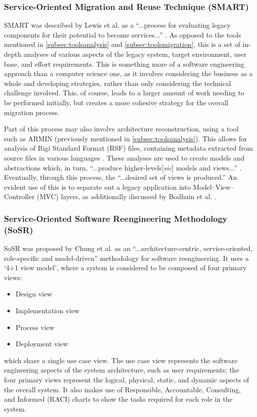 \documentclass[12pt,journal,compsoc]{IEEEtran}
\begin{document}
\subsubsection{Service-Oriented Migration and Reuse Technique (SMART)}
\label{subsubsec:smart}
SMART was described by Lewis et al. as a ``...process for evaluating legacy components for their potential to become services...'' \cite{Lewis2005,Lewis2005a}. As opposed to the tools mentioned in \autoref{subsec:toolsanalysis} and \autoref{subsec:toolsmigration}, this is a set of in-depth analyses of various aspects of the legacy system, target environment, user base, and effort requirements. This is something more of a software engineering approach than a computer science one, as it involves considering the business as a whole and developing strategies, rather than only considering the technical challenge involved. This, of course, leads to a larger amount of work needing to be performed initially, but creates a more cohesive strategy for the overall migration process.

Part of this process may also involve architecture reconstruction, using a tool such as ARMIN (previously mentioned in \autoref{subsec:toolsanalysis}). This allows for analysis of Rigi Standard Format (RSF) \cite{Kienle2010} files, containing metadata extracted from source files in various languages \cite{O'Brien2005}. These analyses are used to create models and abstractions which, in turn, ``...produce higher-levels[\textit{sic}] models and views...'' \cite{O'Brien2005}. Eventually, through this process, the ``...desired set of views is produced.'' \cite{O'Brien2005} An evident use of this is to separate out a legacy application into Model--View--Controller (MVC) layers, as additionally discussed by Bodhuin et al. \cite{Bodhuin2002}.

\subsubsection{Service-Oriented Software Reengineering Methodology (SoSR)}
\label{subsubsec:sosr}
SoSR was proposed by Chung et al. as an ``...architecture-centric, service-oriented, role-specific and model-driven'' \cite{Chung2007} methodology for software reengineering. It uses a `4+1 view model', where a system is considered to be composed of four primary views:
\begin{itemize}
\item Design view
\item Implementation view
\item Process view
\item Deployment view
\end{itemize}
which share a single use case view. The use case view represents the software engineering aspects of the system architecture, such as user requirements; the four primary views represent the logical, physical, static, and dynamic aspects of the overall system. It also makes use of Responsible, Accountable, Consulting, and Informed (RACI) charts \cite{Smith2005} to show the tasks required for each role in the system.
\end{document}
